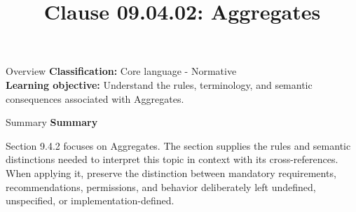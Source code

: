 \documentclass[10pt,letterpaper]{article}
\title{Clause 09.04.02: Aggregates}
\author{}
\date{}
\begin{document}
\maketitle
\begin{CornellOverviewBox}{Overview}
\textbf{Classification:} Core language - Normative\\[2pt]
\textbf{Learning objective:} Understand the rules, terminology, and semantic consequences associated with Aggregates.
\end{CornellOverviewBox}\begin{CornellSummaryBox}{Summary}
{\sffamily\bfseries\color{Accent} Summary}\par\vspace{3pt}Section 9.4.2 focuses on Aggregates. The section supplies the rules and semantic distinctions needed to interpret this topic in context with its cross-references. When applying it, preserve the distinction between mandatory requirements, recommendations, permissions, and behavior deliberately left undefined, unspecified, or implementation-defined.
\end{CornellSummaryBox}
\end{document}
